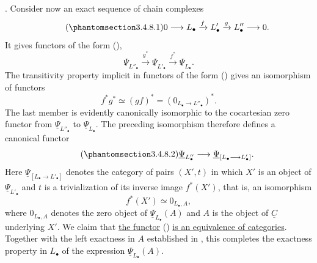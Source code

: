
. Consider now an exact sequence of chain complexes
\begin{equation}\tag{\SGARefTarget{sga7.sga7i.evii.n3-4-8-1}{3.4.8.1}}
 0\longrightarrow L_\bullet\xrightarrow{f}L'_\bullet
 \xrightarrow{g}L''_\bullet\longrightarrow0.
\end{equation}
It gives functors of the form (),
\[
 \underline\Psi_{L''_\bullet}\xrightarrow{g^*}
 \underline\Psi_{L'_\bullet}\xrightarrow{f^*}
 \underline\Psi_{L_\bullet}.
\]
The transitivity property implicit in functors of the form ()
gives an isomorphism of functors
\[
 f^*g^*\simeq(gf)^*=(0_{L_\bullet\to L''_\bullet})^*.
\]
The last member is evidently canonically isomorphic to the
cocartesian zero functor from $\underline\Psi_{L''_\bullet}$ to
$\underline\Psi_{L_\bullet}$.  The preceding isomorphism therefore
defines a canonical functor
\begin{equation}\tag{\SGARefTarget{sga7.sga7i.evii.n3-4-8-2}{3.4.8.2}}
 \underline\Psi_{L''_\bullet}\longrightarrow
 \underline\Psi_{[L_\bullet\longrightarrow L'_\bullet]}.
\end{equation}
Here $\underline\Psi_{[L_\bullet\longrightarrow L'_\bullet]}$
denotes the category of pairs $(X',t)$ in which $X'$ is an object of
$\underline\Psi_{L'_\bullet}$ and $t$ is a trivialization of its
inverse image $f^*(X')$, that is, an isomorphism
\[
 f^*(X')\simeq0_{L_\bullet,A},
\]
where $0_{L_\bullet,A}$ denotes the zero object of
$\underline\Psi_{L_\bullet}(A)$ and $A$ is the object of
$\underline C$ underlying $X'$.  We claim that \underline{the
functor} () \underline{is an equivalence of categories}.
Together with the left exactness in $A$ established in , this
completes the exactness property in $L_\bullet$ of the expression
$\underline\Psi_{L_\bullet}(A)$.

